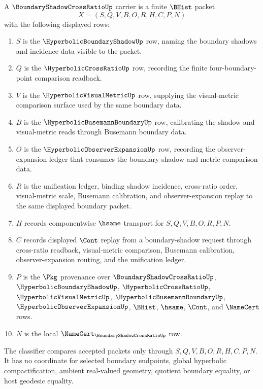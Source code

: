 \begin{definition}
\label{def:boundary-shadow-cross-ratio-carrier}
A $\BoundaryShadowCrossRatioUp$ carrier is a finite $\BHist$ packet
$$
X=(S,Q,V,B,O,R,H,C,P,N)
$$
with the following displayed rows:
\begin{enumerate}
\item $S$ is the $\HyperbolicBoundaryShadowUp$ row, naming the boundary shadows and incidence data visible to the packet.
\item $Q$ is the $\HyperbolicCrossRatioUp$ row, recording the finite four-boundary-point comparison readback.
\item $V$ is the $\HyperbolicVisualMetricUp$ row, supplying the visual-metric comparison surface used by the same boundary data.
\item $B$ is the $\HyperbolicBusemannBoundaryUp$ row, calibrating the shadow and visual-metric reads through Busemann boundary data.
\item $O$ is the $\HyperbolicObserverExpansionUp$ row, recording the observer-expansion ledger that consumes the boundary-shadow and metric comparison data.
\item $R$ is the unification ledger, binding shadow incidence, cross-ratio order, visual-metric scale, Busemann calibration, and observer-expansion replay to the same displayed boundary packet.
\item $H$ records componentwise $\hsame$ transport for $S,Q,V,B,O,R,P,N$.
\item $C$ records displayed $\Cont$ replay from a boundary-shadow request through cross-ratio readback, visual-metric comparison, Busemann calibration, observer-expansion routing, and the unification ledger.
\item $P$ is the $\Pkg$ provenance over $\BoundaryShadowCrossRatioUp$, $\HyperbolicBoundaryShadowUp$, $\HyperbolicCrossRatioUp$, $\HyperbolicVisualMetricUp$, $\HyperbolicBusemannBoundaryUp$, $\HyperbolicObserverExpansionUp$, $\BHist$, $\hsame$, $\Cont$, and $\NameCert$ rows.
\item $N$ is the local $\NameCert_{\BoundaryShadowCrossRatioUp}$ row.
\end{enumerate}
The classifier compares accepted packets only through $S,Q,V,B,O,R,H,C,P,N$. It has no coordinate for selected boundary endpoints, global hyperbolic compactification, ambient real-valued geometry, quotient boundary equality, or host geodesic equality.
\end{definition}

